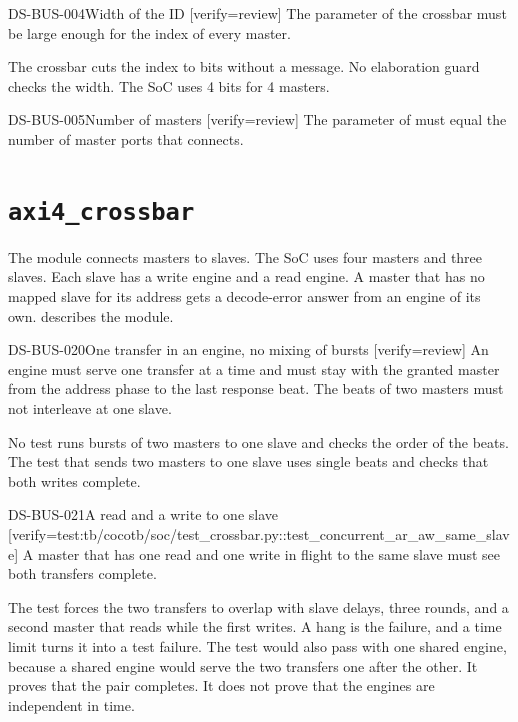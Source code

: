 \begin{requirement}{DS-BUS-004}{Width of the ID}
[verify={review}]
The parameter  of the crossbar must be large enough for the index of every master.
\end{requirement}
\begin{information}
The crossbar cuts the index to  bits without a message. No elaboration guard checks the width. The SoC uses 4 bits for 4 masters.
\end{information}

\begin{requirement}{DS-BUS-005}{Number of masters}
[verify={review}]
The parameter  of  must equal the number of master ports that  connects.
\end{requirement}

\section{\texttt{axi4\_crossbar}}\label{ds:mod:axi4-crossbar}
The module  connects  masters to  slaves. The SoC uses four masters and three slaves. Each slave has a write engine and a read engine. A master that has no mapped slave for its address gets a decode-error answer from an engine of its own.  describes the module.

\begin{requirement}{DS-BUS-020}{One transfer in an engine, no mixing of bursts}
[verify={review}]
An engine must serve one transfer at a time and must stay with the granted master from the address phase to the last response beat. The beats of two masters must not interleave at one slave.
\end{requirement}
\begin{information}
No test runs bursts of two masters to one slave and checks the order of the beats. The test that sends two masters to one slave uses single beats and checks that both writes complete.
\end{information}

\begin{requirement}{DS-BUS-021}{A read and a write to one slave}
[verify={test:tb/cocotb/soc/test_crossbar.py::test_concurrent_ar_aw_same_slave}]
A master that has one read and one write in flight to the same slave must see both transfers complete.
\end{requirement}
\begin{information}
The test forces the two transfers to overlap with slave delays, three rounds, and a second master that reads while the first writes. A hang is the failure, and a time limit turns it into a test failure. The test would also pass with one shared engine, because a shared engine would serve the two transfers one after the other. It proves that the pair completes. It does not prove that the engines are independent in time.
\end{information}

